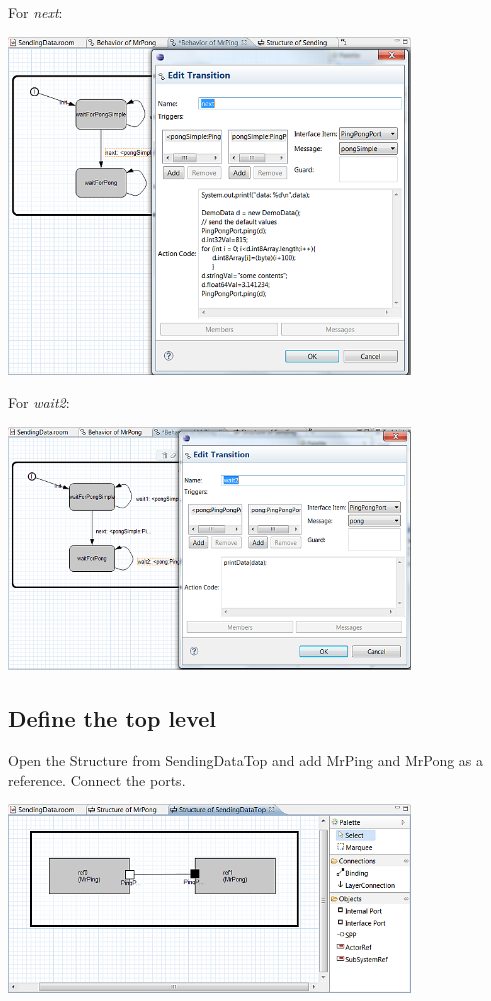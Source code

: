 For \textit{next}:

\includegraphics[width=0.8\textwidth]{images/025-SendingData11.png}

For \textit{wait2}:

\includegraphics[width=0.8\textwidth]{images/025-SendingData12.png}

\subsection{Define the top level}

Open the Structure from SendingDataTop and add MrPing and MrPong as a reference. Connect the ports.

\includegraphics[width=0.8\textwidth]{images/025-SendingData13.png}


